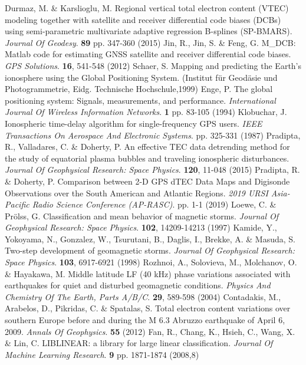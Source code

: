 \documentclass[sn-mathphys-num]{sn-jnl}%
\begin{document}
\begin{thebibliography}{000}
Durmaz, M. \& Karslioglu, M. Regional vertical total electron content (VTEC) modeling together with satellite and receiver differential code biases (DCBs) using semi-parametric multivariate adaptive regression B-splines (SP-BMARS). {\em Journal Of Geodesy}. \textbf{89} pp. 347-360 (2015)
Jin, R., Jin, S. \& Feng, G. M_DCB: Matlab code for estimating GNSS satellite and receiver differential code biases. {\em GPS Solutions}. \textbf{16}, 541-548 (2012)
Schaer, S. Mapping and predicting the Earth's ionosphere using the Global Positioning System. (Institut für Geodäsie und Photogrammetrie, Eidg. Technische Hochschule,1999)
Enge, P. The global positioning system: Signals, measurements, and performance. {\em International Journal Of Wireless Information Networks}. \textbf{1} pp. 83-105 (1994)
Klobuchar, J. Ionospheric time-delay algorithm for single-frequency GPS users. {\em IEEE Transactions On Aerospace And Electronic Systems}. pp. 325-331 (1987)
Pradipta, R., Valladares, C. \& Doherty, P. An effective TEC data detrending method for the study of equatorial plasma bubbles and traveling ionospheric disturbances. {\em Journal Of Geophysical Research: Space Physics}. \textbf{120}, 11-048 (2015)
Pradipta, R. \& Doherty, P. Comparison between 2-D GPS dTEC Data Maps and Digisonde Observations over the South American and Atlantic Regions. {\em 2019 URSI Asia-Pacific Radio Science Conference (AP-RASC)}. pp. 1-1 (2019)
Loewe, C. \& Prölss, G. Classification and mean behavior of magnetic storms. {\em Journal Of Geophysical Research: Space Physics}. \textbf{102}, 14209-14213 (1997)
Kamide, Y., Yokoyama, N., Gonzalez, W., Tsurutani, B., Daglis, I., Brekke, A. \& Masuda, S. Two-step development of geomagnetic storms. {\em Journal Of Geophysical Research: Space Physics}. \textbf{103}, 6917-6921 (1998)
Rozhnoi, A., Solovieva, M., Molchanov, O. \& Hayakawa, M. Middle latitude LF (40 kHz) phase variations associated with earthquakes for quiet and disturbed geomagnetic conditions. {\em Physics And Chemistry Of The Earth, Parts A/B/C}. \textbf{29}, 589-598 (2004)
Contadakis, M., Arabelos, D., Pikridas, C. \& Spatalas, S. Total electron content variations over southern Europe before and during the M 6.3 Abruzzo earthquake of April 6, 2009. {\em Annals Of Geophysics}. \textbf{55} (2012)
Fan, R., Chang, K., Hsieh, C., Wang, X. \& Lin, C. LIBLINEAR: a library for large linear classification. {\em Journal Of Machine Learning Research}. \textbf{9} pp. 1871-1874 (2008,8)

\end{thebibliography}
\end{document}
